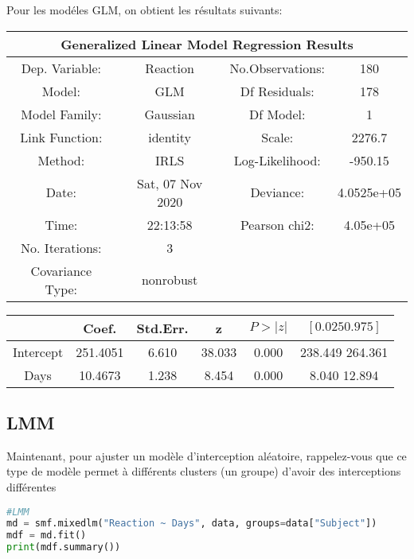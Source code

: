 Pour les modéles GLM, on obtient les résultats suivants:

\begin{center}
\begin{tabular}{ c c c c }
\multicolumn{4}{c}{Generalized Linear Model Regression Results} \\
\hline
\hline
Dep. Variable: & Reaction & No.Observations: & 180 \\
Model: & GLM & Df Residuals: & 178\\
Model Family: & Gaussian & Df Model: & 1\\
Link Function: & identity & Scale: & 2276.7\\
Method: & IRLS & Log-Likelihood: & -950.15\\
Date: & Sat, 07 Nov 2020 & Deviance: & 4.0525e+05\\
Time: & 22:13:58 & Pearson chi2: & 4.05e+05\\
No. Iterations: & 3 & & \\                                         
Covariance Type: & nonrobust & & \\
\end{tabular}
\begin{tabular}{ c c c c c c }
\hline
 & Coef. & Std.Err. & z & $P>|z|$  & $[0.025  0.975]$\\
\hline
Intercept & 251.4051 & 6.610 & 38.033 & 0.000 & 238.449  264.361\\
Days & 10.4673 & 1.238 & 8.454 & 0.000 & 8.040  12.894\\
\hline
\hline
\end{tabular}
\end{center}

\newpage

\subsection{LMM}

Maintenant, pour ajuster un modèle d'interception aléatoire, rappelez-vous que ce type de modèle permet à différents clusters (un groupe) d'avoir des interceptions différentes

\begin{lstlisting}[language=Python]
#LMM
md = smf.mixedlm("Reaction ~ Days", data, groups=data["Subject"])
mdf = md.fit()
print(mdf.summary())
\end{lstlisting}

